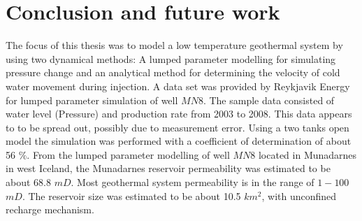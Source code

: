 
\chapter{Conclusion and future work} %

\label{Chapter5} %




The focus of this thesis was to model a low temperature geothermal system by using two dynamical methods:  A lumped parameter modelling for simulating pressure change and an analytical method for determining the velocity of cold water movement during injection. A data set was provided by Reykjavik Energy for lumped parameter simulation of well $MN 8$. The sample data consisted of water level (Pressure) and production rate from 2003 to 2008. This data appears to to be spread out, possibly due to measurement error. Using a two tanks open model the simulation was performed with a coefficient of determination of about 56 $\%$. From the lumped parameter modelling of well $MN 8$ located in Munadarnes in west Iceland, the Munadarnes reservoir permeability  was estimated to be about 68.8 $mD$. Most geothermal system permeability is in the range of $1-100$ $mD$.
The reservoir size was estimated to be about 10.5 $km^{2}$, with unconfined recharge mechanism. \\

